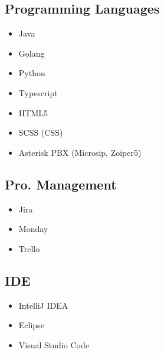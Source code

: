 
\begin{cventries}
\begin{row}[cellsep=0.75cm]{4}{3}
    \begin{cell}{2}
	\section*{Programming Languages}
	\vspace{-1.5ex}
    \begin{itemize}
        \item {Java}
        \item {Golang}
        \item {Python}
        \item {Typescript}
        \item {HTML5}
        \item {SCSS (CSS)}
        \item {Asterisk PBX (Microsip, Zoiper5)}
    \end{itemize}
	\end{cell}
	\begin{cell}{1}
	\section*{Pro. Management}
	\vspace{-1.5ex}
    \begin{itemize}
        \item {Jira}
        \item {Monday}
        \item {Trello}
    \end{itemize}
	\end{cell}
    \begin{cell}{1}
	\section*{IDE}
	\vspace{-1.5ex}
    \begin{itemize}
        \item {IntelliJ IDEA}
        \item {Eclipse}
        \item {Visual Studio Code}
    \end{itemize}
	\end{cell}
\end{row}


\end{cventries}
